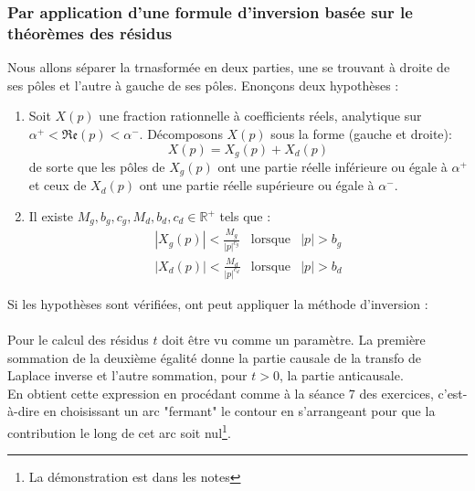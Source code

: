 		\subsubsection{Par application d'une formule d'inversion basée sur le théorèmes des 
		résidus}
		Nous allons séparer la trnasformée en deux parties, une se trouvant à droite de ses
		pôles et l'autre à gauche de ses pôles.
		Enonçons deux hypothèses : 
		\begin{enumerate}
		\item Soit $X(p)$ une fraction rationnelle à coefficients réels, analytique sur $\alpha^+ <
		\mathfrak{Re}(p) < \alpha^-$. Décomposons $X(p)$ sous la forme (gauche et droite):
		\begin{equation}
		X(p) = X_g(p) +X_d(p)
		\end{equation}
		de sorte que les pôles de $X_g(p)$ ont une partie réelle inférieure ou égale à $\alpha^+$ 
		et ceux de $X_d(p)$ ont une partie réelle supérieure ou égale à $\alpha^-$.
		\item Il existe $M_g, b_g, c_g,M_d, b_d, c_d \in \mathbb{R}^+$ tels que :
		\begin{equation}
		\begin{array}{lll}
		|X_g(p)| < \frac{M_g}{|p|^{c_g}} & \text{lorsque} & |p| > b_g\\
		|X_d(p)| < \frac{M_d}{|p|^{c_d}} & \text{lorsque} & |p| > b_d
		\end{array}
		\end{equation}
		\end{enumerate}
		Si les hypothèses sont vérifiées, ont peut appliquer la méthode d'inversion :\\
		
		\ \\
		
		Pour le calcul des résidus $t$ doit être vu comme un paramètre.  La première sommation de 
		la deuxième égalité donne la partie causale de la transfo de Laplace inverse et l'autre 
		sommation, pour $t > 0$, la partie anticausale.\\
		En obtient cette expression en procédant comme à la séance 7 des exercices, c'est-à-dire en
		choisissant un arc "fermant" le contour en s'arrangeant pour que la contribution le long de
		cet arc soit nul\footnote{La démonstration est dans les notes}.\\
		
